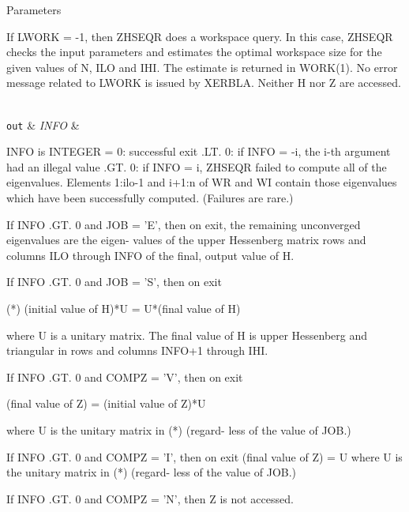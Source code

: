 \begin{DoxyParams}[1]{Parameters}
\begin{DoxyVerb}
           If LWORK = -1, then ZHSEQR does a workspace query.
           In this case, ZHSEQR checks the input parameters and
           estimates the optimal workspace size for the given
           values of N, ILO and IHI.  The estimate is returned
           in WORK(1).  No error message related to LWORK is
           issued by XERBLA.  Neither H nor Z are accessed.\end{DoxyVerb}
\\
\hline
\mbox{\tt out}  & {\em I\+N\+F\+O} & \begin{DoxyVerb}          INFO is INTEGER
             =  0:  successful exit
           .LT. 0:  if INFO = -i, the i-th argument had an illegal
                    value
           .GT. 0:  if INFO = i, ZHSEQR failed to compute all of
                the eigenvalues.  Elements 1:ilo-1 and i+1:n of WR
                and WI contain those eigenvalues which have been
                successfully computed.  (Failures are rare.)

                If INFO .GT. 0 and JOB = 'E', then on exit, the
                remaining unconverged eigenvalues are the eigen-
                values of the upper Hessenberg matrix rows and
                columns ILO through INFO of the final, output
                value of H.

                If INFO .GT. 0 and JOB   = 'S', then on exit

           (*)  (initial value of H)*U  = U*(final value of H)

                where U is a unitary matrix.  The final
                value of  H is upper Hessenberg and triangular in
                rows and columns INFO+1 through IHI.

                If INFO .GT. 0 and COMPZ = 'V', then on exit

                  (final value of Z)  =  (initial value of Z)*U

                where U is the unitary matrix in (*) (regard-
                less of the value of JOB.)

                If INFO .GT. 0 and COMPZ = 'I', then on exit
                      (final value of Z)  = U
                where U is the unitary matrix in (*) (regard-
                less of the value of JOB.)

                If INFO .GT. 0 and COMPZ = 'N', then Z is not
                accessed.\end{DoxyVerb}
 \\
\hline
\end{DoxyParams}
